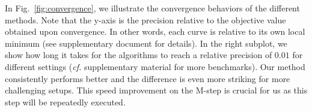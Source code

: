 In Fig.~\ref{fig:convergence}, we illustrate the convergence behaviors of the different methods.
Note that the y-axis is the precision relative to the objective value obtained upon convergence. In other words, each curve is relative to its own local minimum (see supplementary document for details).
In the right subplot, we show how long it takes for the algorithms to reach a relative precision of $0.01$ for different settings (\textit{cf.} supplementary material for more benchmarks). Our method consistently performs better and the difference is even more striking for more challenging setups. This speed improvement on the M-step is crucial for us as this step will be repeatedly executed. %
%
\newcommand{\tmpsize}{0.15}
